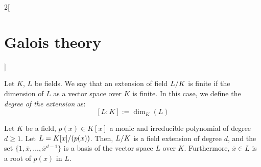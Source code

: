 \documentclass[../../../main.tex]{subfiles}
\begin{document}
\begin{multicols}{2}[\section{Galois theory}]
\begin{prop}
  \end{prop}
  \begin{definition}
    Let $K$, $L$ be fields. We say that an extension of field $\quot{L}{K}$ is finite if the dimension of $L$ as a vector space over $K$ is finite. In this case, we define the \textit{degree of the extension} as: $$[L:K]:=\dim_K(L)$$
  \end{definition}
  \begin{prop}
    Let $K$ be a field, $p(x)\in K[x]$ a monic and irreducible polynomial of degree $d\geq 1$. Let $L=\quot{K[x]}{(p(x))}$. Then, $\quot{L}{K}$ is a field extension of degree $d$, and the set $\{1,\bar{x},\ldots,\bar{x}^{d-1}\}$ is a basis of the vector space $L$ over $K$. Furthermore, $\bar{x}\in L$ is a root of $p(x)$ in $L$.
  \end{prop}
\end{multicols}
\end{document}
